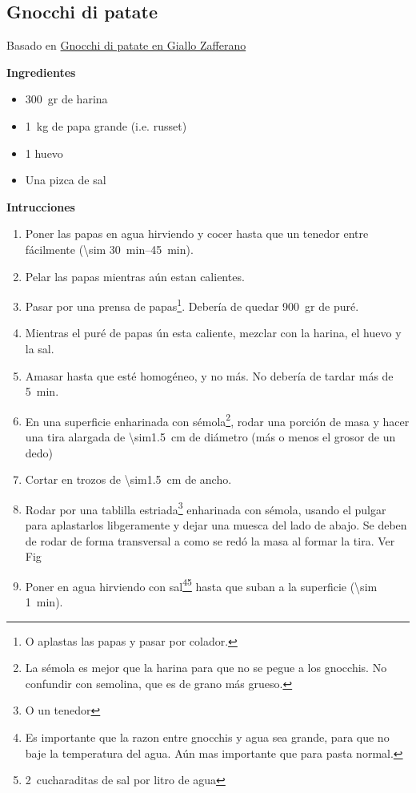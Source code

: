 \subsection{Gnocchi di patate}

Basado en \href{https://ricette.giallozafferano.it/Gnocchi-di-patate.html}{Gnocchi di patate en Giallo Zafferano}

\textbf{Ingredientes}
\begin{itemize}
\item \SI{300}{gr} de harina
\item \SI{1}{kg} de papa grande (i.e. russet)
\item 1 huevo
\item Una pizca de sal
\end{itemize}

\textbf{Intrucciones}
\begin{enumerate}
\item Poner las papas en agua hirviendo y cocer hasta que un tenedor entre fácilmente (\SIrange{\sim 30}{45}{min}).
\item Pelar las papas mientras aún estan calientes.
\item Pasar por una prensa de papas\footnote{O aplastas las papas y pasar por colador.}. Debería de quedar \SI{900}{gr} de puré.
\item Mientras el puré de papas ún esta caliente, mezclar con la harina, el huevo y la sal. 
\item Amasar hasta que esté homogéneo, y no más. No debería de tardar más de \SI{5}{min}.
\item En una superficie enharinada con sémola\footnote{La sémola es mejor que la harina para que no se pegue a los gnocchis. No confundir con semolina, que es de grano más grueso.}, rodar una porción de masa y hacer una tira alargada de \SI{\sim1.5}{cm} de diámetro (más o menos el grosor de un dedo)
\item Cortar en trozos de \SI{\sim1.5}{cm} de ancho.
\item Rodar por una tablilla estriada\footnote{O un tenedor} enharinada con sémola, usando el pulgar para aplastarlos libgeramente y dejar una muesca del lado de abajo. Se deben de rodar de forma transversal a como se redó la masa al formar la tira. Ver Fig 
\item Poner en agua hirviendo con sal\footnote{Es importante que la razon entre gnocchis y agua sea grande, para que no baje la temperatura del agua. Aún mas importante que para pasta normal.}\footnote{\SI{2}{cucharaditas} de sal por litro de agua} hasta que suban a la superficie (\SI{\sim 1}{min}).
\end{enumerate}


